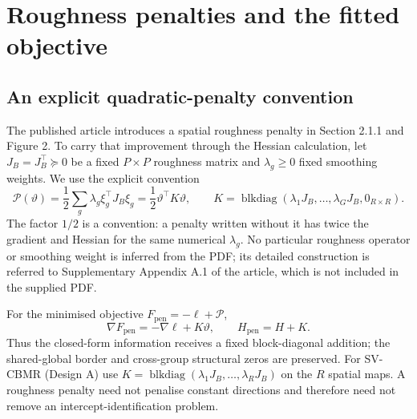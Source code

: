\documentclass[11pt,a4paper]{article}
\newcommand{\blkdiag}{\operatorname{blkdiag}}
\numberwithin{equation}{section}
\begin{document}
\section{Roughness penalties and the fitted objective}\label{sec:penalty}

\subsection{An explicit quadratic-penalty convention}
The published article introduces a spatial roughness penalty in Section 2.1.1
and Figure 2. To carry that improvement through the Hessian calculation,
let $J_B=J_B^\top\succeq0$ be a fixed $P\times P$ roughness matrix and
$\lambda_g\geq0$ fixed smoothing weights. We use the explicit convention
\begin{equation}
 \mathcal P(\vartheta)=\frac12\sum_g\lambda_g\xi_g^\top J_B\xi_g
 =\frac12\vartheta^\top K\vartheta,\qquad
 K=\blkdiag(\lambda_1J_B,\ldots,\lambda_GJ_B,0_{R\times R}).
\end{equation}
The factor $1/2$ is a convention: a penalty written without it has twice the
gradient and Hessian for the same numerical $\lambda_g$. No particular
roughness operator or smoothing weight is inferred from the PDF; its detailed
construction is referred to Supplementary Appendix A.1 of the article,
which is not included in the supplied PDF.

For the minimised objective $F_{\mathrm{pen}}=-\ell+\mathcal P$,
\begin{equation}\label{eq:penalty}
 \nabla F_{\mathrm{pen}}=-\nabla\ell+K\vartheta,\qquad
 H_{\mathrm{pen}}=H+K.
\end{equation}
Thus the closed-form information receives a fixed block-diagonal addition;
the shared-global border and cross-group structural zeros are preserved.
For SV-CBMR (Design A) use
$K=\blkdiag(\lambda_1J_B,\ldots,\lambda_RJ_B)$ on the $R$ spatial maps.
A roughness penalty need not penalise constant directions and therefore
need not remove an intercept-identification problem.
\end{document}
